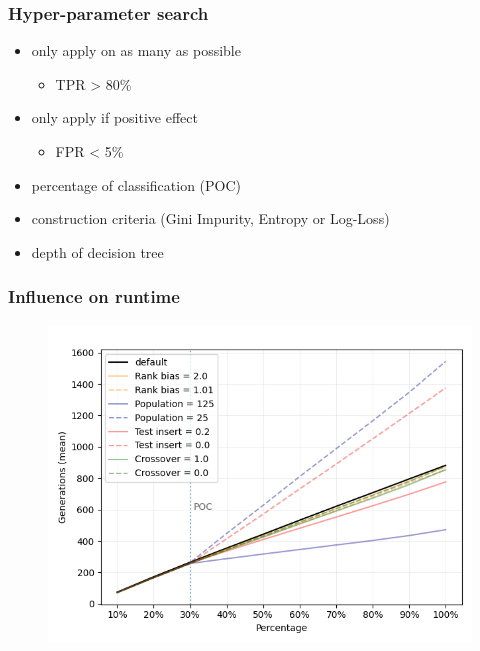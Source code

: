 \begin{frame}
	\frametitle{Hyper-parameter search}
	
	\begin{itemize}
		\item only apply on as many as possible
			\begin{itemize}
				\item TPR > 80\%
			\end{itemize}
		\item only apply if positive effect
			\begin{itemize}
				\item FPR < 5\%
			\end{itemize}
		\item percentage of classification (POC)
		\item construction criteria (Gini Impurity, Entropy or Log-Loss)
		\item depth of decision tree
	\end{itemize}
	
\end{frame}

\begin{frame}
	\frametitle{Influence on runtime}
	\begin{figure}
		\includegraphics[height=0.9\textheight]{figures/generations_parameter}
	\end{figure}	
\end{frame}


